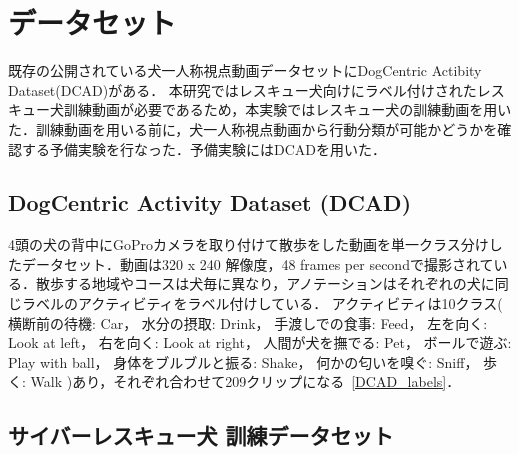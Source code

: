 \chapter{データセット}
既存の公開されている犬一人称視点動画データセットにDogCentric Actibity Dataset(DCAD)がある．
本研究ではレスキュー犬向けにラベル付けされたレスキュー犬訓練動画が必要であるため，本実験ではレスキュー犬の訓練動画を用いた．訓練動画を用いる前に，犬一人称視点動画から行動分類が可能かどうかを確認する予備実験を行なった．予備実験にはDCADを用いた．
\section{DogCentric Activity Dataset (DCAD)}
4頭の犬の背中にGoProカメラを取り付けて散歩をした動画を単一クラス分けしたデータセット．動画は320 x 240 解像度，48 frames per secondで撮影されている．散歩する地域やコースは犬毎に異なり，アノテーションはそれぞれの犬に同じラベルのアクティビティをラベル付けしている．
アクティビティは10クラス(
横断前の待機: Car， 水分の摂取: Drink， 手渡しでの食事: Feed， 左を向く: Look at left， 右を向く: Look at right， 人間が犬を撫でる: Pet， ボールで遊ぶ: Play with ball， 身体をブルブルと振る: Shake， 何かの匂いを嗅ぐ: Sniff， 歩く: Walk
)あり，それぞれ合わせて209クリップになる~\ref{DCAD_labels}．
\begin{table}[tb]
\end{table}
\section{サイバーレスキュー犬 訓練データセット}


